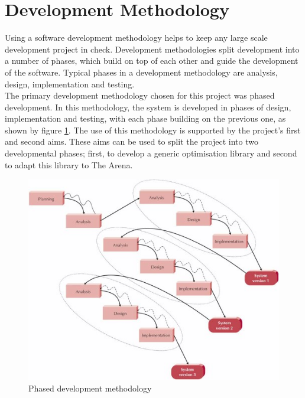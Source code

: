 \section{Development Methodology}
Using a software development methodology helps to keep any large scale development project in check. Development methodologies split development into a number of phases, which build on top of each other and guide the development of the software. Typical phases in a development methodology are analysis, design, implementation and testing.
\\The primary development methodology chosen for this project was phased development. In this methodology, the system is developed in phases of design, implementation and testing, with each phase building on the previous one, as shown by figure \ref{fig:phased}\cite{phased}. The use of this methodology is supported by the project's first and second aims. These aims can be used to split the project into two developmental phases; first, to develop a generic optimisation library and second to adapt this library to The Arena.
\begin{figure}[tp]
   \begin{center}
     \includegraphics{Figures/phased}
   \end{center}
   \caption{Phased development methodology}
   \label{fig:phased}
\end{figure}